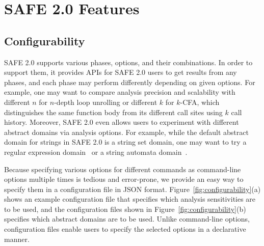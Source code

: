 \documentclass[10pt, conference]{IEEEtran}
\newcommand{\safe}{{SAFE 2.0}\xspace}
\begin{document}
\section{SAFE 2.0 Features}

\subsection{Configurability}
\safe supports various phases, options, and their combinations.
In order to support them, it provides APIs for \safe users to get results
from any phases, and each phase may perform differently depending on
given options.  For example, one may want to compare analysis precision
and scalability with different $n$ for $n$-depth loop unrolling or
different $k$ for $k$-CFA, which distinguishes the same function body
from its different call sites using $k$ call history.  Moreover, \safe even
allows users to experiment with different abstract domains via analysis
options.  For example, while the default abstract domain for strings in
\safe is a string set domain, one may want to try a regular expression
domain~\cite{dls16} or a string automata domain~\cite{aplas14}.


Because specifying various options for different commands as
command-line options multiple times is tedious and error-prone,
we provide an easy way to specify them in a configuration file in
JSON format.  Figure~\ref{fig:configurability}(a) shows an example
configuration file that specifies which analysis sensitivities are to be
used, and the configuration files shown in
Figure~\ref{fig:configurability}(b) specifies which abstract domains
are to be used.  Unlike command-line options,
configuration files enable users to specify the selected options
in a declarative manner.
\end{document}
